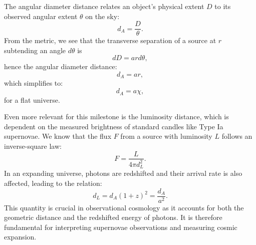 \documentclass{aa}
\numberwithin{equation}{section}
\numberwithin{table}{section}
\numberwithin{figure}{section}
\begin{document}
The angular diameter distance relates an object's physical extent $D$ to its observed angular extent $\theta$ on the sky:
\begin{equation}
d_A = \frac{D}{\theta}.
\end{equation}
From the metric, we see that the transverse separation of a source at $r$ subtending an angle $d\theta$ is
\begin{equation}
  dD = a r d\theta,
\end{equation}
hence the angular diameter distance:
\begin{equation}
  d_A = a r,
\end{equation}
which simplifies to:
\begin{equation}
  d_A = a \chi,
\end{equation}
for a flat universe.

Even more relevant for this milestone is the luminosity distance, which is dependent on the measured brightness of standard candles like Type Ia supernovae. We know that the flux $F$ from a source with luminosity $L$ follows an inverse-square law:
\begin{equation}
  F = \frac{L}{4\pi d_L^2}.
\end{equation}
In an expanding universe, photons are redshifted and their arrival rate is also affected, leading to the relation:
\begin{equation}
  d_L = d_A (1 + z)^2 = \frac{d_A}{a^2}.
\end{equation}
This quantity is crucial in observational cosmology as it accounts for both the geometric distance and the redshifted energy of photons. It is therefore fundamental for interpreting supernovae observations and measuring cosmic expansion.
\end{document}
